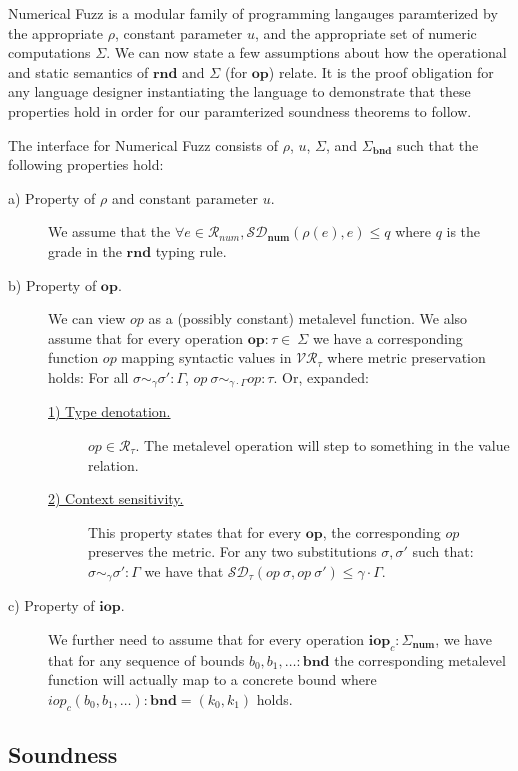 Numerical Fuzz is a modular family of programming langauges paramterized by the
appropriate $\rho$, constant parameter $u$, and the appropriate set of numeric
computations $\Sigma$.  
We can now state a few assumptions about how the operational and static
semantics of $\mathbf{rnd}$ and $\Sigma$ (for $\mathbf{op}$) relate.
It is the proof obligation for any language designer instantiating the language
to demonstrate that these properties hold in order for our paramterized
soundness theorems to follow.
\begin{definition}
  \label{def:numfuzz-interface}
  The interface for Numerical Fuzz consists of $\rho$, $u$, $\Sigma$, and
  $\Sigma_{\mathbf{bnd}}$ such that the following properties hold: 
\begin{description}
  \item[a) Property of $\rho$ and constant parameter $u$.] We assume that the
    $\forall e \in \mathcal{R}_{num}, \mathcal{SD}_{\mathbf{num}}(\rho(e), e)
    \leq q$ where $q$ is the grade in the $\mathbf{rnd}$ typing rule.
  \item[b) Property of $\mathbf{op}$.] 
    We can view $\textit{op}$ as a (possibly constant) metalevel function.
    We also assume that for every operation
    $\mathbf{op} : \tau \in \ \Sigma$ we have a
    corresponding function $op$ mapping syntactic values in
    $\mathcal{VR}_{\tau}$ where metric preservation holds: For all $\sigma
    \sim_{\gamma} \sigma' : \Gamma$, $\textit{op}~\sigma \sim_{\gamma \cdot
    \Gamma} \textit{op} : \tau$.
    Or, expanded:
    \begin{description}
      \item[\underline{1) Type denotation.}] $\mathit{op} \in
        \mathcal{R}_{\tau}$. The metalevel operation will step to something in the
        value relation.
      \item[\underline{2) Context sensitivity.}]
        This property states that for every $\textbf{op}$, the
        corresponding $\textit{op}$ preserves the metric. For any two
        substitutions $\sigma, \sigma'$ such that:
        $\sigma \sim_{\gamma} \sigma' : \Gamma$
        we have that
        $\mathcal{SD}_{\tau}(\textit{op}~\sigma, \textit{op}~\sigma') \leq \gamma \cdot \Gamma$.
    \end{description} \item[c) Property of $\mathbf{iop}$.] We further need to
      assume that for every operation $\mathbf{iop}_c : \Sigma_\textbf{num}$, we
      have that for any sequence of bounds $b_0, b_1, \ldots : \textbf{bnd}$ the
      corresponding metalevel function will actually map to a concrete bound
      where $\textit{iop}_c(b_0, b_1, \ldots) : \textbf{bnd} = (k_0, k_1)$
      holds.
\end{description}
\end{definition}

\subsection{Soundness} \label{sec:soundness}


